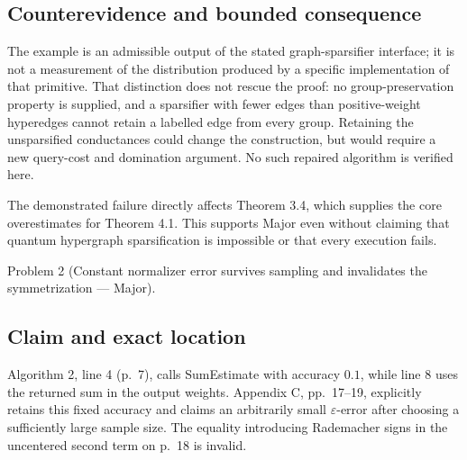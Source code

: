 \documentclass[10pt]{article}
\begin{document}
\subsection*{Counterevidence and bounded consequence}
The example is an admissible output of the stated graph-sparsifier interface; it is not a measurement of the distribution produced by a specific implementation of that primitive. That distinction does not rescue the proof: no group-preservation property is supplied, and a sparsifier with fewer edges than positive-weight hyperedges cannot retain a labelled edge from every group. Retaining the unsparsified conductances could change the construction, but would require a new query-cost and domination argument. No such repaired algorithm is verified here.\par
The demonstrated failure directly affects Theorem 3.4, which supplies the core overestimates for Theorem 4.1. This supports Major even without claiming that quantum hypergraph sparsification is impossible or that every execution fails.\par
Problem 2 (Constant normalizer error survives sampling and invalidates the symmetrization — Major).\par
\subsection*{Claim and exact location}
Algorithm 2, line 4 (p. 7), calls SumEstimate with accuracy \(0.1\), while line 8 uses the returned sum in the output weights. Appendix C, pp. 17–19, explicitly retains this fixed accuracy and claims an arbitrarily small \(\varepsilon\)-error after choosing a sufficiently large sample size. The equality introducing Rademacher signs in the uncentered second term on p. 18 is invalid.\par
\end{document}
